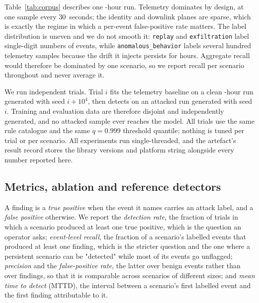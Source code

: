 \documentclass[10pt,journal]{IEEEtran}
\begin{document}
Table~\ref{tab:corpus} describes one \expSimHours-hour run. Telemetry dominates
by design, at one sample every 30~seconds; the identity and downlink
planes are sparse, which is exactly the regime in which a per-event
false-positive rate matters. The label distribution is uneven and we do not
smooth it: \texttt{replay} and \texttt{exfiltration} label single-digit numbers
of events, while \texttt{anomalous\_behavior} labels several hundred telemetry
samples because the drift it injects persists for hours. Aggregate recall would
therefore be dominated by one scenario, so we report recall per scenario
throughout and never average it.



We run \expNumSeeds{} independent trials. Trial $i$ fits the telemetry baseline
on a clean \expSimHours-hour run generated with seed $i + 10^{4}$, then detects
on an attacked run generated with seed $i$. Training and evaluation data are
therefore disjoint and independently generated, and no attacked sample ever
reaches the model. All trials use the same rule catalogue and the same
$q = 0.999$ threshold quantile; nothing is tuned per trial or per scenario. All
experiments run single-threaded, and the artefact's result record stores the
library versions and platform string alongside every number reported here.

\subsection{Metrics, ablation and reference detectors}

A finding is a \emph{true positive} when the event it names carries an attack
label, and a \emph{false positive} otherwise. We report the \emph{detection
rate}, the fraction of trials in which a scenario produced at least one true
positive, which is the question an operator asks; \emph{event-level recall},
the fraction of a scenario's labelled events that produced at least one
finding, which is the stricter question and the one where a persistent scenario
can be "detected" while most of its events go unflagged; \emph{precision} and the
\emph{false-positive rate}, the latter over benign events rather than over
findings, so that it is comparable across scenarios of different sizes; and
\emph{mean time to detect} (MTTD), the interval between a scenario's first
labelled event and the first finding attributable to it.
\end{document}
